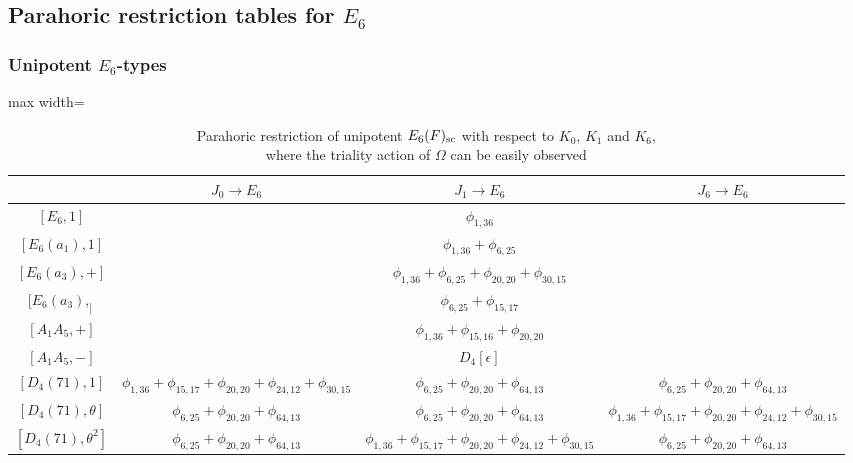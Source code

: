 
\begin{landscape}
    \subsection{Parahoric restriction tables for \texorpdfstring{$E_6$}{PDFstring}}

    
    \subsubsection*{Unipotent \texorpdfstring{$E_6$}{PDFstring}-types}

    \begin{table}[h!]
    \centering
    \caption{Parahoric restriction of unipotent $E_6(F)_{\mathrm{sc}}$ with respect to $K_0$, $K_1$ and $K_6$,\\ where the triality action of $\Omega$ can be easily observed}
    \label{tbl:E6_hyperspecialWJ0}
    \begin{adjustbox}{max width=\linewidth}
        \begin{tabular}{|c|c|c|c|}
            \hline
            & $J_0\longrightarrow E_6$ & $J_1\longrightarrow E_6$ & $J_6\longrightarrow E_6$ \\\hline

            $[E_6,1]$ & \multicolumn{3}{c|}{$\phi_{1,36}$} \\\hline

            $[E_6(a_1),1]$ & \multicolumn{3}{c|}{$\phi_{1,36}+\phi_{6,25}$} \\\hline

            $[E_6(a_3),+]$ & \multicolumn{3}{c|}{$\phi_{1,36}+\phi_{6,25}+\phi_{20,20}+\phi_{30,15}$} \\
            $[E_6(a_3),_]$ & \multicolumn{3}{c|}{$\phi_{6,25}+\phi_{15,17}$} \\
            $[A_1A_5,+]$ & \multicolumn{3}{c|}{$\phi_{1,36}+\phi_{15,16}+\phi_{20,20}$} \\
            $[A_1A_5,-]$ & \multicolumn{3}{c|}{$D_4[\epsilon]$} \\\hline

            $[D_4(71),1]$ & $\phi_{1,36}+\phi_{15,17}+\phi_{20,20}+\phi_{24,12}+\phi_{30,15}$ &  $\phi_{6,25}+\phi_{20,20}+\phi_{64,13}$ &  $\phi_{6,25}+\phi_{20,20}+\phi_{64,13}$ \\
            $[D_4(71),\theta]$ & $\phi_{6,25}+\phi_{20,20}+\phi_{64,13}$ & $\phi_{6,25}+\phi_{20,20}+\phi_{64,13}$ & $\phi_{1,36}+\phi_{15,17}+\phi_{20,20}+\phi_{24,12}+\phi_{30,15}$  \\
            $[D_4(71),\theta^2]$ & $\phi_{6,25}+\phi_{20,20}+\phi_{64,13}$ &  $\phi_{1,36}+\phi_{15,17}+\phi_{20,20}+\phi_{24,12}+\phi_{30,15}$ & $\phi_{6,25}+\phi_{20,20}+\phi_{64,13}$ \\\hline
            


\end{tabular}
\end{adjustbox}
\end{table}
\end{landscape}
